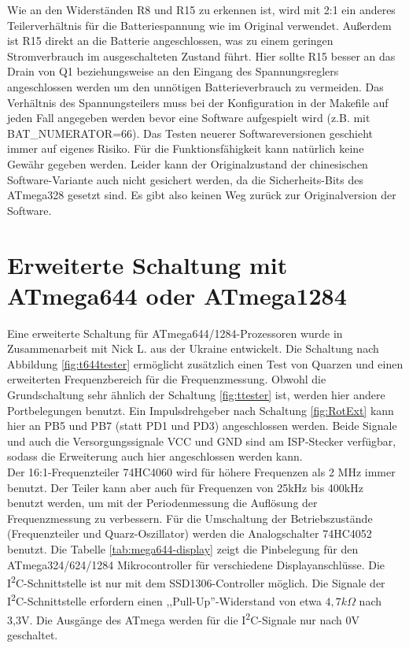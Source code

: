 Wie an den Widerständen R8 und R15 zu erkennen ist, 
wird mit 2:1 ein anderes Teilerverhältnis für die Batteriespannung wie im Original verwendet.
Außerdem ist R15 direkt an die Batterie angeschlossen, was zu einem geringen Stromverbrauch im
ausgeschalteten Zustand führt. Hier sollte R15 besser an das Drain von Q1 beziehungsweise an den
Eingang des Spannungsreglers angeschlossen werden um den unnötigen Batterieverbrauch zu vermeiden.
Das Verhältnis des Spannungsteilers muss bei der Konfiguration in der Makefile auf jeden Fall angegeben
werden bevor eine Software aufgespielt wird (z.B. mit BAT\_NUMERATOR=66).
Das Testen neuerer Softwareversionen geschieht immer auf eigenes Risiko.
Für die Funktionsfähigkeit kann natürlich keine Gewähr gegeben werden.
Leider kann der Originalzustand der chinesischen Software-Variante auch nicht gesichert werden,
da die Sicherheits-Bits des ATmega328 gesetzt sind.
Es gibt also keinen Weg zurück zur Originalversion der Software. 

\section{Erweiterte Schaltung mit ATmega644 oder ATmega1284}

Eine erweiterte Schaltung für ATmega644/1284-Prozessoren wurde in Zusammenarbeit mit Nick L. aus
der Ukraine entwickelt. Die Schaltung nach Abbildung \ref{fig:t644tester} ermöglicht zusätzlich
einen Test von Quarzen und einen erweiterten Frequenzbereich für die Frequenzmessung.
Obwohl die Grundschaltung sehr ähnlich der Schaltung \ref{fig:ttester} ist, werden hier
andere Portbelegungen benutzt.
Ein Impulsdrehgeber nach Schaltung \ref{fig:RotExt} kann hier an PB5 und PB7 (statt PD1 und PD3) angeschlossen werden.
Beide Signale und auch die Versorgungssignale VCC und GND sind am ISP-Stecker verfügbar,
sodass die Erweiterung auch hier angeschlossen werden kann.\\

Der 16:1-Frequenzteiler 74HC4060 wird für höhere Frequenzen als 2 MHz immer benutzt.
Der Teiler kann aber auch für Frequenzen von 25kHz bis 400kHz benutzt werden, um mit der
Periodenmessung die Auflösung der Frequenzmessung zu verbessern.
Für die Umschaltung der Betriebszustände (Frequenzteiler und Quarz-Oszillator) werden
die Analogschalter 74HC4052 benutzt.
Die Tabelle \ref{tab:mega644-display} zeigt die Pinbelegung für den ATmega324/624/1284 Mikrocontroller für verschiedene Displayanschlüsse.
Die I\textsuperscript{2}C-Schnittstelle ist nur mit dem SSD1306-Controller möglich.
Die Signale der I\textsuperscript{2}C-Schnittstelle erfordern einen ,,Pull-Up''-Widerstand von etwa \(4,7k\Omega\) nach 3,3V.
Die Ausgänge des ATmega werden für die I\textsuperscript{2}C-Signale nur nach 0V geschaltet.


